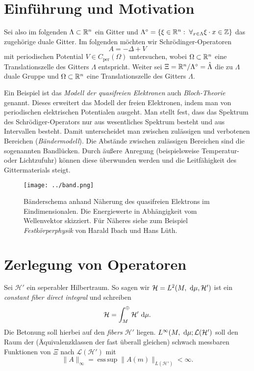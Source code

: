 \documentclass{mywork}
\DeclareMathOperator*{\esssup}{ess\,sup}
\begin{document}
\section{Einführung und Motivation}

Sei also im folgenden $\Lambda \subset \R^n$ ein Gitter und $\Lambda^\circ= \{\xi \in \R^n: \forall_{x\in \Lambda} \xi \cdot x \in \Z\}$ das zugehörige duale Gitter. Im folgenden möchten wir Schrödinger-Operatoren 
$$ A=- \Delta + V$$
mit periodischen Potential $V\in C_{\text{per}}(\Omega)$ untersuchen, wobei $\Omega \subset \R^n$ eine Translationszelle des Gitters $\Lambda$ entspricht.   Weiter sei $\Xi= \R^n/ \Lambda^\circ= \hat \Lambda$ die zu $\Lambda$ duale Gruppe und $\Omega\subset \R^n$ eine Translationszelle des Gitters $\Lambda$.

Ein Beispiel ist das \emph{Modell der quasifreien Elektronen} auch \emph{Bloch-Theorie} genannt.  Dieses erweitert das Modell  der freien Elektronen, indem man von periodischen elektrischen Potentialen ausgeht. Man stellt fest, dass das Spektrum des Schrödiger-Operators nur aus wesentliches Spektrum besteht und aus Intervallen besteht.  Damit unterscheidet man zwischen zulässigen und verbotenen Bereichen (\emph{Bändermodell}).  Die Abstände zwischen zulässigen Bereichen sind die sogenannten Bandlücken.   Durch äußere Anregung (beispielsweise Temperatur- oder Lichtzufuhr) können diese überwunden werden und die Leitfähigkeit des Gittermaterials steigt.

\begin{figure}[H]
\centering
\texttt{[image: ../band.png]}
\caption{Bänderschema anhand Näherung des quasifreien Elektrons im Eindimensionalen. Die Energiewerte in Abhängigkeit vom Wellenvektor skizziert. Für Näheres siehe zum Beispiel \emph{Festkörperphysik} von Harald Ibach und Hans Lüth.}
\end{figure}

\section{Zerlegung von Operatoren}
Sei $\mathcal H'$ ein seperabler Hilbertraum. So sagen wir $\mathcal H = L^2(M, \, \dx[\mu], \mathcal H')$ ist ein \emph{constant fiber direct integral} und schreiben
$$
\mathcal H = \int_{M}^\oplus  \mathcal H' \, \dx[\mu].
$$
Die Betonung soll hierbei auf den \emph{fibers} $\mathcal H'$ liegen. $L^\infty(M, \, \dx[\mu]; \mathcal L(\mathcal H')$ soll den Raum der (Äquivalenzklassen der fast überall gleichen) schwach messbaren Funktionen von $\Xi$ nach $\mathcal L(\mathcal H')$ mit
$$
\|A\|_{\infty}= \esssup\|A(m)\|_{L(\mathcal H')} < \infty.
$$ 
\end{document}
